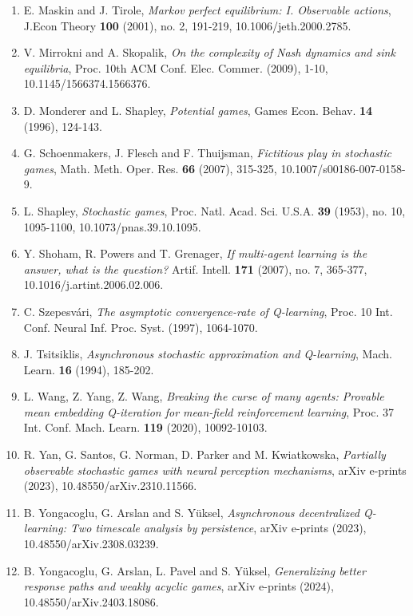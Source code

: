 \documentclass[10pt]{article}
\newcommand{\1}[1]{\mathbbm{1}_{#1}}
\begin{document}
\begin{enumerate}
        \item E. Maskin and J. Tirole, {\it Markov perfect equilibrium: I. Observable actions}, J.Econ Theory {\bf 100} (2001), no. 2, 191-219, 10.1006/jeth.2000.2785.
        \item V. Mirrokni and A. Skopalik, {\it On the complexity of Nash dynamics and sink equilibria}, Proc. 10th ACM Conf. Elec. Commer. (2009), 1-10, 10.1145/1566374.1566376.
        \item D. Monderer and L. Shapley, {\it Potential games}, Games Econ. Behav. {\bf 14} (1996), 124-143.
        \item G. Schoenmakers, J. Flesch and F. Thuijsman, {\it Fictitious play in stochastic games}, Math. Meth. Oper. Res. {\bf 66} (2007), 315-325, 10.1007/s00186-007-0158-9.
        \item L. Shapley, {\it Stochastic games}, Proc. Natl. Acad. Sci. U.S.A. {\bf 39} (1953), no. 10, 1095-1100, 10.1073/pnas.39.10.1095.
        \item Y. Shoham, R. Powers and T. Grenager, {\it If multi-agent learning is the answer, what is the question?} Artif. Intell. {\bf 171} (2007), no. 7, 365-377, 10.1016/j.artint.2006.02.006.
        \item C. Szepesv\'ari, {\it The asymptotic convergence-rate of Q-learning}, Proc. 10 Int. Conf. Neural Inf. Proc. Syst. (1997), 1064-1070.
        \item J. Tsitsiklis, {\it Asynchronous stochastic approximation and Q-learning}, Mach. Learn. {\bf 16} (1994), 185-202.
        \item L. Wang, Z. Yang, Z. Wang, {\it Breaking the curse of many agents: Provable mean embedding Q-iteration for mean-field reinforcement learning}, Proc. 37 Int. Conf. Mach. Learn. {\bf 119} (2020), 10092-10103.
        \item R. Yan, G. Santos, G. Norman, D. Parker and M. Kwiatkowska, {\it Partially observable stochastic games with neural perception mechanisms}, arXiv e-prints (2023), 10.48550/arXiv.2310.11566.
        \item B. Yongacoglu, G. Arslan and S. Y\"uksel, {\it Asynchronous decentralized Q-learning: Two timescale analysis by persistence}, arXiv e-prints (2023), 10.48550/arXiv.2308.03239.
        \item B. Yongacoglu, G. Arslan, L. Pavel and S. Y\"uksel, {\it Generalizing better response paths and weakly acyclic games}, arXiv e-prints (2024), 10.48550/arXiv.2403.18086.
    \end{enumerate}
\end{document}
